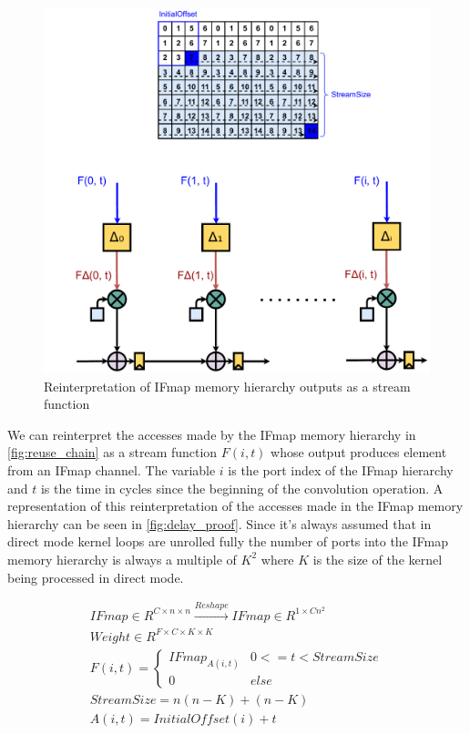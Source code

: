 \begin{figure}[]
    \centering
    \includegraphics[scale=0.5]{fig/delayproof.pdf}
    \caption{Reinterpretation of IFmap memory hierarchy outputs as a stream function}
    \label{fig:delay_proof}
\end{figure}

We can reinterpret the accesses made by the IFmap memory hierarchy in
\autoref{fig:reuse_chain} as a stream function $F(i, t)$ whose output produces
element from an IFmap channel. The variable $i$ is the port index of the IFmap
hierarchy and $t$ is the time in cycles since the beginning of the convolution
operation. A representation of this reinterpretation of the accesses made in the
IFmap memory hierarchy can be seen in \autoref{fig:delay_proof}. Since it's
always assumed that in direct mode kernel loops are unrolled fully the number of
ports into the IFmap memory hierarchy is always a multiple of $K^2$ where $K$ is
the size of the kernel being processed in direct mode. 

\begin{gather}
    IFmap \in R^{C\times n \times n} \xrightarrow{Reshape} IFmap \in R^{1\times Cn^2} \\
    Weight \in R^{F\times C\times K \times K} \\
    F(i, t)=    \begin{cases}
                    IFmap_{A(i, t)} & 0<=t < StreamSize \\
                    0 & else
                \end{cases} \\
    StreamSize = n(n-K)+(n-K) \\
    A(i, t) = InitialOffset(i) + t
\end{gather}

